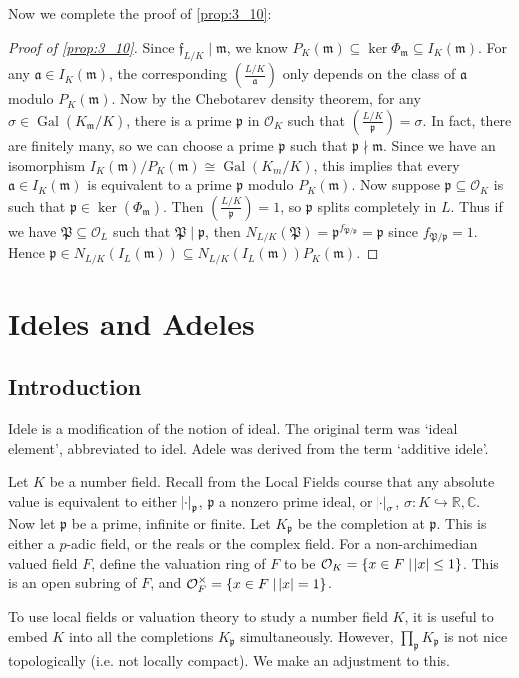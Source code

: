 \documentclass[11pt]{article}
\theoremstyle{definition}
\theoremstyle{plain}
\theoremstyle{remark}
\DeclareMathOperator{\Gal}{Gal}
\newcommand{\RR}{\mathbb{R}}
\newcommand{\CC}{\mathbb{C}}
\newcommand{\cO}{\mathcal{O}}
\newcommand{\cp}{\mathfrak{P}}
\newcommand{\fa}{\mathfrak{a}}
\newcommand{\ff}{\mathfrak{f}}
\newcommand{\fp}{\mathfrak{p}}
\newcommand{\fm}{\mathfrak{m}}
\newcommand{\leg}[2]{\left(\frac{#1}{#2}\right)}
\begin{document}
\noindent Now we complete the proof of \autoref{prop:3_10}:
\begin{proof}[Proof of \autoref{prop:3_10}]
    Since $\ff_{L/K} \mid \fm$, we know $P_K(\fm) \subseteq \ker \Phi_\fm \subseteq I_K(\fm)$. For any $\fa \in I_K(\fm)$, the corresponding $\leg{L/K}{\fa}$ only depends on the class of $\fa$ modulo $P_K(\fm)$. Now by the Chebotarev density theorem, for any $\sigma \in \Gal(K_\fm / K)$, there is a prime $\fp$ in $\cO_K$ such that $\leg{L/K}{\fp} = \sigma$. In fact, there are finitely many, so we can choose a prime $\fp$ such that $\fp \nmid \fm$. Since we have an isomorphism $I_K(\fm) / P_K(\fm) \cong \Gal(K_m / K)$, this implies that every $\fa \in I_K(\fm)$ is equivalent to a prime $\fp$ modulo $P_K(\fm)$. Now suppose $\fp \subseteq \cO_K$ is such that $\fp \in \ker(\Phi_\fm)$. Then $\leg{L/K}{\fp} = 1$, so $\fp$ splits completely in $L$. Thus if we have $\cp \subseteq \cO_L$ such that $\cp \mid \fp$, then $N_{L/K}(\cp) = \fp^{f_{\cp/\fp}} = \fp$ since $f_{\cp/\fp} = 1$. Hence $\fp \in N_{L/K}(I_L(\fm)) \subseteq N_{L/K}(I_L(\fm)) P_K(\fm)$.
\end{proof}

\section{Ideles and Adeles}

\subsection{Introduction}

Idele is a modification of the notion of ideal. The original term was `ideal element', abbreviated to idel. Adele was derived from the term `additive idele'.

Let $K$ be a number field. Recall from the Local Fields course that any absolute value is equivalent to either $\abs{\cdot}_\fp$, $\fp$ a nonzero prime ideal, or $\abs{\cdot}_\sigma$, $\sigma : K \hookrightarrow \RR, \CC$. Now let $\fp$ be a prime, infinite or finite. Let $K_\fp$ be the completion at $\fp$. This is either a $p$-adic field, or the reals or the complex field. For a non-archimedian valued field $F$, define the valuation ring of $F$ to be $\cO_K = \{x \in F \mid \abs{x} \le 1\}$. This is an open subring of $F$, and $\cO_F^\times = \{x \in F \mid \abs{x} = 1\}$.

To use local fields or valuation theory to study a number field $K$, it is useful to embed $K$ into all the completions $K_\fp$ simultaneously. However, $\prod_\fp K_\fp$ is not nice topologically (i.e. not locally compact). We make an adjustment to this.
\end{document}

